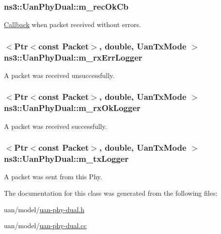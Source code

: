 \subsubsection[{\texorpdfstring{m\+\_\+rec\+Ok\+Cb}{m_recOkCb}}]{ ns3\+::\+Uan\+Phy\+Dual\+::m\+\_\+rec\+Ok\+Cb\hspace{0.3cm}{\ttfamily [private]}}\hypertarget{classns3_1_1UanPhyDual_a02108c001d3caa3b354350221b316726}{}\label{classns3_1_1UanPhyDual_a02108c001d3caa3b354350221b316726}
\hyperlink{classns3_1_1Callback}{Callback} when packet received without errors. 
\subsubsection[{\texorpdfstring{m\+\_\+rx\+Err\+Logger}{m_rxErrLogger}}]{$<${\bf Ptr}$<$const {\bf Packet}$>$, double, {\bf Uan\+Tx\+Mode} $>$ ns3\+::\+Uan\+Phy\+Dual\+::m\+\_\+rx\+Err\+Logger\hspace{0.3cm}{\ttfamily [private]}}\hypertarget{classns3_1_1UanPhyDual_a2933108d3c6337b137ff15ad4fc201c6}{}\label{classns3_1_1UanPhyDual_a2933108d3c6337b137ff15ad4fc201c6}
A packet was received unsuccessfully. 
\subsubsection[{\texorpdfstring{m\+\_\+rx\+Ok\+Logger}{m_rxOkLogger}}]{$<${\bf Ptr}$<$const {\bf Packet}$>$, double, {\bf Uan\+Tx\+Mode} $>$ ns3\+::\+Uan\+Phy\+Dual\+::m\+\_\+rx\+Ok\+Logger\hspace{0.3cm}{\ttfamily [private]}}\hypertarget{classns3_1_1UanPhyDual_adfdf3cb0199f848fdc9ad75474d0ab0e}{}\label{classns3_1_1UanPhyDual_adfdf3cb0199f848fdc9ad75474d0ab0e}
A packet was received successfully. 
\subsubsection[{\texorpdfstring{m\+\_\+tx\+Logger}{m_txLogger}}]{$<${\bf Ptr}$<$const {\bf Packet}$>$, double, {\bf Uan\+Tx\+Mode} $>$ ns3\+::\+Uan\+Phy\+Dual\+::m\+\_\+tx\+Logger\hspace{0.3cm}{\ttfamily [private]}}\hypertarget{classns3_1_1UanPhyDual_a455f735d55ccdaaa2b5d593b22ea33ec}{}\label{classns3_1_1UanPhyDual_a455f735d55ccdaaa2b5d593b22ea33ec}
A packet was sent from this Phy. 

The documentation for this class was generated from the following files\+:\begin{DoxyCompactItemize}
\item 
uan/model/\hyperlink{uan-phy-dual_8h}{uan-\/phy-\/dual.\+h}\item 
uan/model/\hyperlink{uan-phy-dual_8cc}{uan-\/phy-\/dual.\+cc}\end{DoxyCompactItemize}
